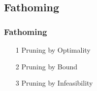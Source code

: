 \documentclass{beamer}
\begin{document}
\subsection{Fathoming}
\begin{frame}
\frametitle{Fathoming}
\Large
\begin{itemize}
\item[1] Pruning by Optimality
\item[2] Pruning by Bound
\item[3] Pruning by Infeasibility
\end{itemize}	
\end{frame}
\end{document}
